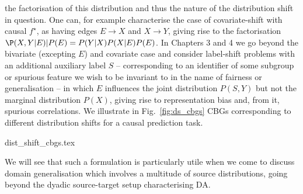 the factorisation of this distribution and thus the nature of the distribution shift in question.
%
One can, for example characterise the case of covariate-shift with causal \(f^\star\), as having
edges  \(E \to X\) and \( X \to Y \), giving rise to the factorisation \( \P(X, Y | E) | P(E) =
P(Y|X)P(X|E)P(E) \). 
%
In Chapters 3 and 4 we go beyond the bivariate (excepting \( E \)) and covariate case and consider
label-shift problems with an additional auxiliary label \(S\) -- corresponding to an identifier of
some subgroup or spurious feature we wish to be invariant to in the name of fairness or
generalisation --  in which \(E\) influences the joint distribution \( P(S, Y) \) but not the
marginal distribution \(P(X)\), giving rise to representation bias and, from it, spurious
correlations.
%
We illustrate in Fig.~\ref{fig:ds_cbgs} CBGs corresponding to different distribution shifts for a
causal prediction task.
%

{dist_shift_cbgs.tex}

%
We will see that such a formulation is particularly utile when we come to discuss domain
generalisation which involves a multitude of source distributions, going beyond the dyadic
source-target setup characterising DA.


